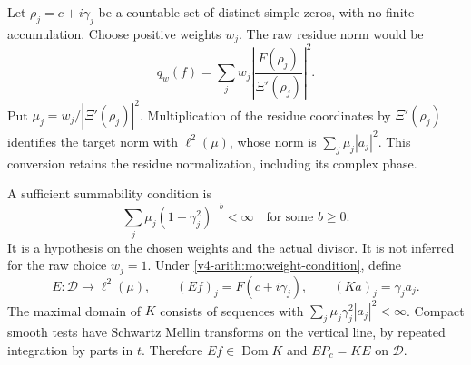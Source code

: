 Let $\rho_j=c+i\gamma_j$ be a countable set of distinct simple
zeros, with no finite accumulation. Choose positive weights $w_j$.
The raw residue norm would be
\begin{equation}
 q_w(f)=\sum_j w_j
       \left|\frac{F(\rho_j)}{\Xi'(\rho_j)}\right|^2.
 \label{v4-arith:mo:weighted-residue-norm}
\end{equation}
Put $\mu_j=w_j/|\Xi'(\rho_j)|^2$. Multiplication of the residue
coordinates by $\Xi'(\rho_j)$ identifies the target norm with
$\ell^2(\mu)$, whose norm is $\sum_j\mu_j|a_j|^2$.
This conversion retains the residue normalization, including its
complex phase.

A sufficient summability condition is
\begin{equation}
 \sum_j\mu_j(1+\gamma_j^2)^{-b}<\infty
 \quad\text{for some }b\geq0.
 \label{v4-arith:mo:weight-condition}
\end{equation}
It is a hypothesis on the chosen weights and the actual divisor.
It is not inferred for the raw choice $w_j=1$. Under
\eqref{v4-arith:mo:weight-condition}, define
\[
 E:\mathscr D\longrightarrow\ell^2(\mu),\qquad
 (Ef)_j=F(c+i\gamma_j),\qquad
 (Ka)_j=\gamma_ja_j.
\]
The maximal domain of $K$ consists of sequences with
$\sum_j\mu_j\gamma_j^2|a_j|^2<\infty$. Compact smooth tests have
Schwartz Mellin transforms on the vertical line, by repeated
integration by parts in $t$. Therefore $Ef\in\operatorname{Dom}K$
and $EP_c=KE$ on $\mathscr D$.

